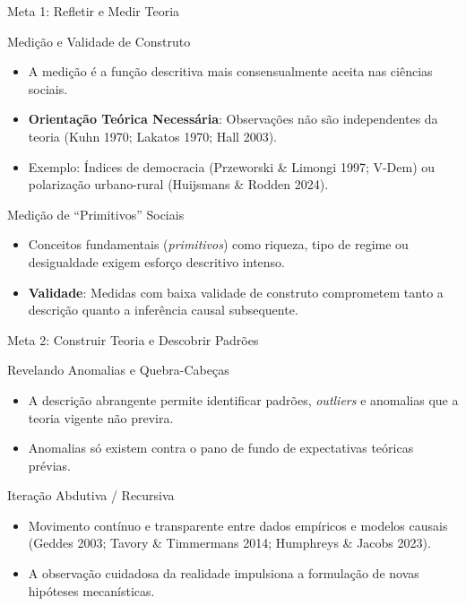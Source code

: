 \documentclass[
  ignorenonframetext,
  aspectratio=169,
  brazilian,
  t,
  10pt]{beamer}
\providecommand{\tightlist}{%
  \setlength{\itemsep}{0pt}\setlength{\parskip}{0pt}}
\begin{document}
\begin{frame}{Meta 1: Refletir e Medir Teoria}
\protect{}\label{meta-1-refletir-e-medir-teoria}
\begin{block}{Medição e Validade de Construto}
\protect{}\label{mediuxe7uxe3o-e-validade-de-construto}
\begin{itemize}
\tightlist
\item
  A medição é a função descritiva mais consensualmente aceita nas
  ciências sociais.
\item
  \textbf{Orientação Teórica Necessária}: Observações não são
  independentes da teoria (Kuhn 1970; Lakatos 1970; Hall 2003).
\item
  Exemplo: Índices de democracia (Przeworski \& Limongi 1997; V-Dem) ou
  polarização urbano-rural (Huijsmans \& Rodden 2024).
\end{itemize}
\end{block}

\begin{block}{Medição de ``Primitivos'' Sociais}
\protect{}\label{mediuxe7uxe3o-de-primitivos-sociais}
\begin{itemize}
\tightlist
\item
  Conceitos fundamentais (\emph{primitivos}) como riqueza, tipo de
  regime ou desigualdade exigem esforço descritivo intenso.
\item
  \textbf{Validade}: Medidas com baixa validade de construto comprometem
  tanto a descrição quanto a inferência causal subsequente.
\end{itemize}
\end{block}
\end{frame}

\begin{frame}{Meta 2: Construir Teoria e Descobrir Padrões}
\protect{}\label{meta-2-construir-teoria-e-descobrir-padruxf5es}
\begin{block}{Revelando Anomalias e Quebra-Cabeças}
\protect{}\label{revelando-anomalias-e-quebra-cabeuxe7as}
\begin{itemize}
\tightlist
\item
  A descrição abrangente permite identificar padrões, \emph{outliers} e
  anomalias que a teoria vigente não previra.
\item
  Anomalias só existem contra o pano de fundo de expectativas teóricas
  prévias.
\end{itemize}
\end{block}

\begin{block}{Iteração Abdutiva / Recursiva}
\protect{}\label{iterauxe7uxe3o-abdutiva-recursiva}
\begin{itemize}
\tightlist
\item
  Movimento contínuo e transparente entre dados empíricos e modelos
  causais (Geddes 2003; Tavory \& Timmermans 2014; Humphreys \& Jacobs
  2023).
\item
  A observação cuidadosa da realidade impulsiona a formulação de novas
  hipóteses mecanísticas.
\end{itemize}
\end{block}
\end{frame}
\end{document}

